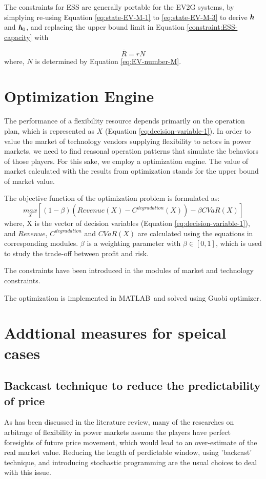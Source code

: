 The constraints for ESS are generally portable for the EV2G systems, by simplying re-using Equation \eqref{eq:state-EV-M-1} to \eqref{eq:state-EV-M-3} to derive $\textit{\textbf{h}}$ and $\textit{\textbf{h}}_0$, and replacing the upper bound limit in Equation \ref{constraint:ESS-capacity} with

\begin{equation}
\overline{R} = \overline{r}N
\end{equation}
where, $N$ is determined by Equation \eqref{eq:EV-number-M}. 




\section{Optimization Engine}
The performance of a flexibility resource depends primarily on the operation plan, which is represented as $X$ (Equation \ref{eq:decision-variable-1}). In order to value the market of technology vendors supplying flexibility to actors in power markets, we need to find reasonal operation patterns that simulate the behaviors of those players. For this sake, we employ a optimization engine. The value of market calculated with the results from optimization stands for the upper bound of market value.

The objective function of the optimization problem is formulated as:
\begin{equation}
\underset{X}{max} \left[ (1-\beta)\left(Revenue (X) - C^{degradation}(X)\right) - \beta CVaR(X) \right]
\end{equation}
where, X is the vector of decision variables (Equation \eqref{eq:decision-variable-1}), and $Revenue$, $C^{degradation}$ and $CVaR(X)$ are calculated using the equations in corresponding modules. $\beta$ is a weighting parameter with $\beta \in [0,1]$, which is used to study the trade-off between profit and risk.

The constraints have been introduced in the modules of market and technology constraints.

The optimization is implemented in MATLAB\textcopyright~and solved using Guobi optimizer. 

\section{Addtional measures for speical cases}
\label{sec:special}

\subsection{Backcast technique to reduce the predictability of price}
As has been discussed in the literature review, many of the researches on arbitrage of flexibility in power markets assume the players have perfect foresights of future price movement, which would lead to an over-estimate of the real market value. Reducing the length of perdictable window, using 'backcast' technique, and introducing stochastic programming are the usual choices to deal with this issue.

